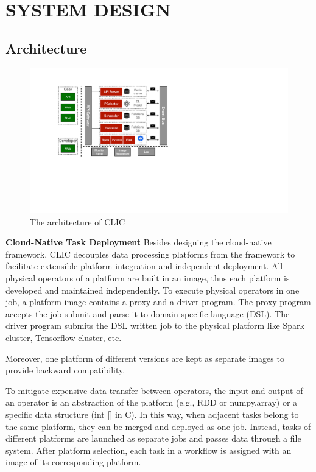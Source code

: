 \section{SYSTEM DESIGN}

\subsection{Architecture}

\begin{figure}[tbh]
    \centering
    \includegraphics[width=0.8\linewidth]{figures/CLIC-arch-2.pdf}
    \caption{The architecture of CLIC}
    \label{fig:architecture}
  \end{figure}

\textbf{Cloud-Native Task Deployment} Besides designing the cloud-native framework, CLIC decouples data processing platforms from the framework to facilitate extensible platform integration and independent deployment.
All physical operators of a platform are built in an image, thus each platform is developed and maintained independently.
To execute physical operators in one job, a platform image contains a proxy and a driver program.
The proxy program accepts the job submit and parse it to domain-specific-language (DSL). 
The driver program submits the DSL written job to the physical platform like Spark cluster, Tensorflow cluster, etc.


Moreover, one platform of different versions are kept as separate images to provide backward compatibility.

To mitigate expensive data transfer between operators, the input and output of an operator is an abstraction of the platform (e.g., RDD or numpy.array) or a specific data structure (int [] in C).
In this way, when adjacent tasks belong to the same platform, they can be merged and deployed as one job.
Instead, tasks of different platforms are launched as separate jobs and passes data through a file system.
After platform selection, each task in a workflow is assigned with an image of its corresponding platform.

